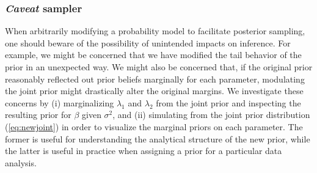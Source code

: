 \documentclass[12pt]{article}
\begin{document}
\subsubsection{\emph{Caveat} sampler} \label{sec:caveat}
When arbitrarily modifying a probability model to facilitate posterior sampling, one
should beware of the possibility of unintended impacts on inference. For example, we
might be concerned that we have modified the tail behavior of the prior in an 
unexpected way. We might also be concerned that, if the original prior reasonably
reflected out prior beliefs marginally for each parameter, modulating the joint prior
might drastically alter the original margins. We investigate these concerns by
(i) marginalizing $\lambda_1$ and $\lambda_2$ from the joint
prior and inspecting the resulting prior for $\beta$ given $\sigma^2$,
and (ii) simulating from the joint prior distribution (\ref{eq:newjoint}) in order to 
visualize the marginal priors on each parameter. The former is useful for understanding 
the analytical structure of the new prior, while the latter is useful in practice when 
assigning a prior for a particular data analysis.
\end{document}
